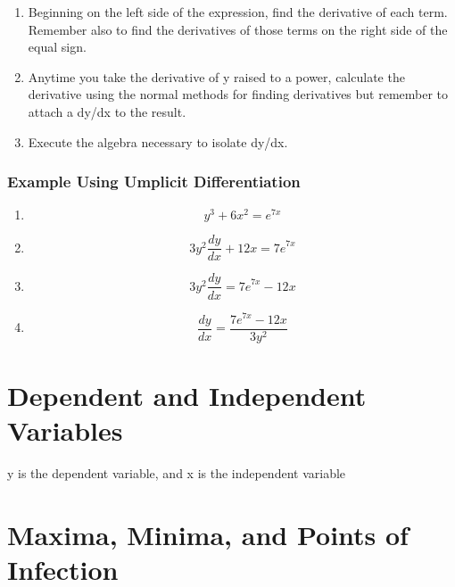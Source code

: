 \documentclass[a4paper,11pt]{book}
\begin{document}
\normalsize
\begin{enumerate}
  \item Beginning on the left side of the expression, find the derivative of each term. Remember also to find the derivatives of those terms on the right side of the equal sign.
  \item Anytime you take the derivative of y raised to a power, calculate the derivative using the normal methods for finding derivatives but remember to attach a dy/dx to the result.
  \item Execute the algebra necessary to isolate dy/dx.
\end{enumerate}

\subsubsection{Example Using Umplicit Differentiation}

\begin{enumerate}
\LARGE
  \item \[ y^3 + 6x^2 = {e}^{7x} \]
  \item \[ 3y^2\frac{dy}{dx} + 12x = {7e}^{7x} \]
  \item \[ 3y^2\frac{dy}{dx} = {7e}^{7x} - 12x \]
  \item \[ \frac{dy}{dx} = \frac{{7e}^{7x} - 12x}{3y^2} \]
\normalsize
\end{enumerate}

\section{Dependent and Independent Variables}
y is the dependent variable, and x is the independent variable








\section{Maxima, Minima, and Points of Infection}
\end{document}
